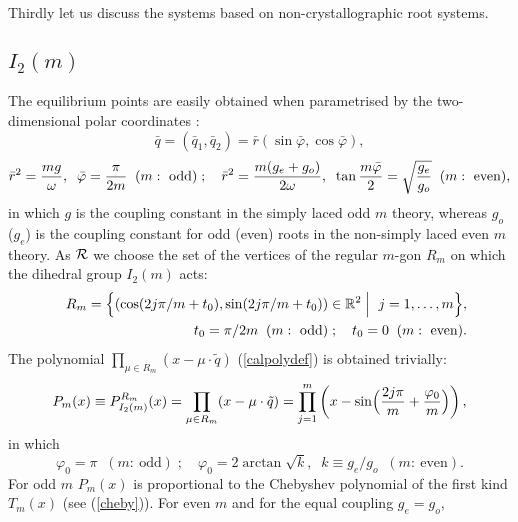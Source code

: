 \documentclass[a4paper,12pt]{article}
\begin{document}
\bigskip
Thirdly let us discuss the systems based on non-crystallographic root systems.

\subsection{$I_2(m)$}

The equilibrium points are easily obtained when parametrised by
the two-dimensional polar coordinates \cite{cs}:
\begin{equation}
   \bar{q}=(\bar{q}_1,\bar{q}_2)=\bar{r}(\sin\bar{\varphi},\cos\bar{\varphi}),
   \label{polar}
\end{equation}
\begin{equation}
   \bar{r}^2={mg\over{\omega}},\;\;
   \bar{\varphi}={\pi\over{2m}}\;\; (m:\ \mbox{odd})\;;
   \quad
   \bar{r}^2={m(g_e+g_o)\over{2\omega}},\;\;
   \tan{m\bar{\varphi}\over2}=\sqrt{g_e\over{g_o}}\;\; (m:\ \mbox{even}),
\end{equation}
in which $g$ is the coupling constant in the simply laced odd $m$ theory,
whereas $g_o$ ($g_e$) is the coupling constant for odd (even) roots in
the non-simply laced even $m$ theory.
As ${\cal R}$ we choose the set of the vertices of the regular $m$-gon
$R_{m}$ on which the dihedral group $I_2(m)$ acts:
\begin{eqnarray}
   &&R_m=\Bigl\{(\cos({2j\pi/ m}+t_0), \sin({2j\pi/ m}+t_0) )
   \in{\mathbb R}^2\Bigm|\ j=1,\ldots,m\Bigr\},
   \label{rmvert}\\
   &&t_0=\pi/2m\;\;(m:\ \mbox{odd})\;;\quad
   t_0=0\;\;(m:\ \mbox{even}). \nonumber
\end{eqnarray}
The polynomial $\prod_{\mu\in{R_m}}(x-\mu\cdot\tilde{q})$ (\ref{calpolydef})
is obtained trivially:
\begin{equation}
   P_m(x)\equiv P_{I_2(m)}^{R_m}(x)=
   \prod_{\mu\in{R_m}}(x-\mu\cdot\tilde{q})
   =\prod_{j=1}^m
   \left(x-\sin\Bigl({2j\pi\over m}+{\varphi_0\over{m}}\Bigr)\right),
   \label{i2poly1}
\end{equation}
in which
\begin{equation}
   \varphi_0=\pi\;\;(m:\ \mbox{odd})\;;\quad
   \varphi_0=2\arctan\sqrt{k},\;\; k\equiv g_e/{g_o}\;\; (m:\ \mbox{even}).
\end{equation}
For odd $m$ $P_m(x)$ is proportional to the Chebyshev polynomial 
of the first kind $T_m(x)$
(see (\ref{cheby})). For even  $m$ and for the equal coupling $g_e=g_o$,
\end{document}
